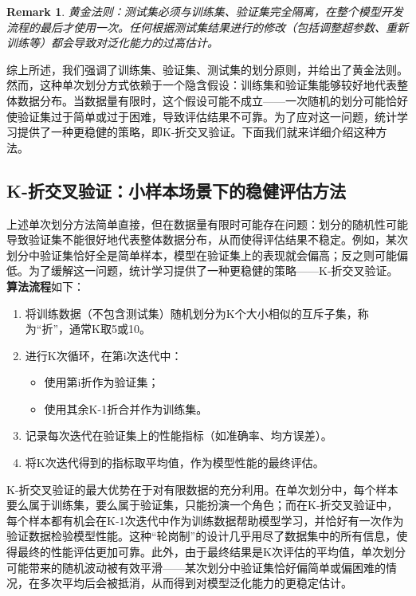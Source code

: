 \documentclass[lang=cn,zihao=-4,a4paper,fontset=windows]{beautybook}
\newtheorem*{remark}{\textbf{Remark}}
\begin{document}
\begin{remark}
    黄金法则：测试集必须与训练集、验证集完全隔离，在整个模型开发流程的最后才使用一次。任何根据测试集结果进行的修改（包括调整超参数、重新训练等）都会导致对泛化能力的过高估计。
\end{remark}

综上所述，我们强调了训练集、验证集、测试集的划分原则，并给出了黄金法则。然而，这种单次划分方式依赖于一个隐含假设：训练集和验证集能够较好地代表整体数据分布。当数据量有限时，这个假设可能不成立——一次随机的划分可能恰好使验证集过于简单或过于困难，导致评估结果不可靠。为了应对这一问题，统计学习提供了一种更稳健的策略，即K-折交叉验证。下面我们就来详细介绍这种方法。

\subsection{K-折交叉验证：小样本场景下的稳健评估方法}

上述单次划分方法简单直接，但在数据量有限时可能存在问题：划分的随机性可能导致验证集不能很好地代表整体数据分布，从而使得评估结果不稳定。例如，某次划分中验证集恰好全是简单样本，模型在验证集上的表现就会偏高；反之则可能偏低。为了缓解这一问题，统计学习提供了一种更稳健的策略——K-折交叉验证。\textbf{算法流程}如下：
\begin{enumerate}
\item 将训练数据（不包含测试集）随机划分为K个大小相似的互斥子集，称为“折”，通常K取5或10。
\item 进行K次循环，在第i次迭代中：
\begin{itemize}
\item 使用第i折作为验证集；
\item 使用其余K-1折合并作为训练集。
\end{itemize}
\item 记录每次迭代在验证集上的性能指标（如准确率、均方误差）。
\item 将K次迭代得到的指标取平均值，作为模型性能的最终评估。
\end{enumerate}

K-折交叉验证的最大优势在于对有限数据的充分利用。在单次划分中，每个样本要么属于训练集，要么属于验证集，只能扮演一个角色；而在K-折交叉验证中，每个样本都有机会在K-1次迭代中作为训练数据帮助模型学习，并恰好有一次作为验证数据检验模型性能。这种“轮岗制”的设计几乎用尽了数据集中的所有信息，使得最终的性能评估更加可靠。此外，由于最终结果是K次评估的平均值，单次划分可能带来的随机波动被有效平滑——某次划分中验证集恰好偏简单或偏困难的情况，在多次平均后会被抵消，从而得到对模型泛化能力的更稳定估计。
\end{document}
